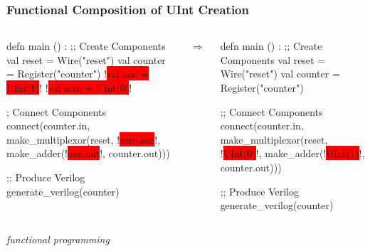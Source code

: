 \documentclass[xcolor=pdflatex,dvipsnames,table]{beamer}
\begin{document}
\begin{frame}[fragile]
\frametitle{Functional Composition of UInt Creation}
\begin{columns}
{
\begin{stanza}
defn main () :
  ;; Create Components
  val reset   = Wire("reset")
  val counter = Register("counter")
  !\colorbox{red}{val one     = UInt(1)}!
  !\colorbox{red}{val zero    = UInt(0)}!

  ; Connect Components
  connect(counter.in, 
    make_multiplexor(reset,
      !\colorbox{red}{zero.out}!,
      make_adder(!\colorbox{red}{one.out}!, counter.out)))

  ;; Produce Verilog
  generate_verilog(counter)
\end{stanza}
}
\begin{center}
$\Rightarrow$
\end{center}
{
\begin{stanza}
defn main () :
  ;; Create Components
  val reset   = Wire("reset")
  val counter = Register("counter")

  ;; Connect Components
  connect(counter.in, 
    make_multiplexor(reset,
      !\colorbox{red}{UInt(0)}!,
      make_adder(!\colorbox{red}{UInt(1)}!, counter.out)))

  ;; Produce Verilog
  generate_verilog(counter)
\end{stanza}
}
\end{columns}
\vspace{1cm}
{\it functional programming}
\end{frame}
\end{document}
